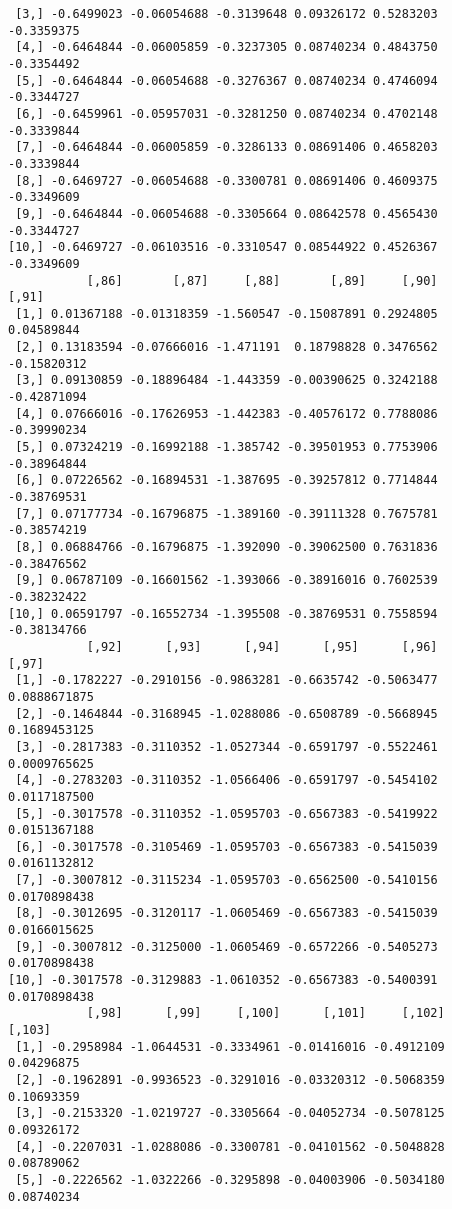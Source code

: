 \documentclass[
  letterpaper,
  DIV=11,
  numbers=noendperiod]{scrreprt}
\begin{document}
\begin{verbatim}
 [3,] -0.6499023 -0.06054688 -0.3139648 0.09326172 0.5283203 -0.3359375
 [4,] -0.6464844 -0.06005859 -0.3237305 0.08740234 0.4843750 -0.3354492
 [5,] -0.6464844 -0.06054688 -0.3276367 0.08740234 0.4746094 -0.3344727
 [6,] -0.6459961 -0.05957031 -0.3281250 0.08740234 0.4702148 -0.3339844
 [7,] -0.6464844 -0.06005859 -0.3286133 0.08691406 0.4658203 -0.3339844
 [8,] -0.6469727 -0.06054688 -0.3300781 0.08691406 0.4609375 -0.3349609
 [9,] -0.6464844 -0.06054688 -0.3305664 0.08642578 0.4565430 -0.3344727
[10,] -0.6469727 -0.06103516 -0.3310547 0.08544922 0.4526367 -0.3349609
           [,86]       [,87]     [,88]       [,89]     [,90]       [,91]
 [1,] 0.01367188 -0.01318359 -1.560547 -0.15087891 0.2924805  0.04589844
 [2,] 0.13183594 -0.07666016 -1.471191  0.18798828 0.3476562 -0.15820312
 [3,] 0.09130859 -0.18896484 -1.443359 -0.00390625 0.3242188 -0.42871094
 [4,] 0.07666016 -0.17626953 -1.442383 -0.40576172 0.7788086 -0.39990234
 [5,] 0.07324219 -0.16992188 -1.385742 -0.39501953 0.7753906 -0.38964844
 [6,] 0.07226562 -0.16894531 -1.387695 -0.39257812 0.7714844 -0.38769531
 [7,] 0.07177734 -0.16796875 -1.389160 -0.39111328 0.7675781 -0.38574219
 [8,] 0.06884766 -0.16796875 -1.392090 -0.39062500 0.7631836 -0.38476562
 [9,] 0.06787109 -0.16601562 -1.393066 -0.38916016 0.7602539 -0.38232422
[10,] 0.06591797 -0.16552734 -1.395508 -0.38769531 0.7558594 -0.38134766
           [,92]      [,93]      [,94]      [,95]      [,96]        [,97]
 [1,] -0.1782227 -0.2910156 -0.9863281 -0.6635742 -0.5063477 0.0888671875
 [2,] -0.1464844 -0.3168945 -1.0288086 -0.6508789 -0.5668945 0.1689453125
 [3,] -0.2817383 -0.3110352 -1.0527344 -0.6591797 -0.5522461 0.0009765625
 [4,] -0.2783203 -0.3110352 -1.0566406 -0.6591797 -0.5454102 0.0117187500
 [5,] -0.3017578 -0.3110352 -1.0595703 -0.6567383 -0.5419922 0.0151367188
 [6,] -0.3017578 -0.3105469 -1.0595703 -0.6567383 -0.5415039 0.0161132812
 [7,] -0.3007812 -0.3115234 -1.0595703 -0.6562500 -0.5410156 0.0170898438
 [8,] -0.3012695 -0.3120117 -1.0605469 -0.6567383 -0.5415039 0.0166015625
 [9,] -0.3007812 -0.3125000 -1.0605469 -0.6572266 -0.5405273 0.0170898438
[10,] -0.3017578 -0.3129883 -1.0610352 -0.6567383 -0.5400391 0.0170898438
           [,98]      [,99]     [,100]      [,101]     [,102]     [,103]
 [1,] -0.2958984 -1.0644531 -0.3334961 -0.01416016 -0.4912109 0.04296875
 [2,] -0.1962891 -0.9936523 -0.3291016 -0.03320312 -0.5068359 0.10693359
 [3,] -0.2153320 -1.0219727 -0.3305664 -0.04052734 -0.5078125 0.09326172
 [4,] -0.2207031 -1.0288086 -0.3300781 -0.04101562 -0.5048828 0.08789062
 [5,] -0.2226562 -1.0322266 -0.3295898 -0.04003906 -0.5034180 0.08740234

\end{verbatim}
\end{document}
